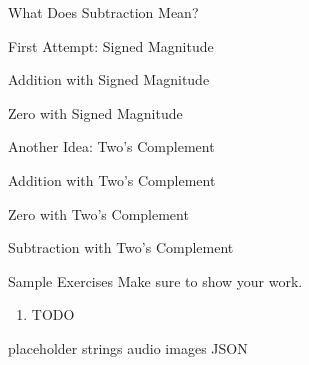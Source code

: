 
\begin{frame}{What Does Subtraction Mean?}
\end{frame}

\begin{frame}{First Attempt: Signed Magnitude}
\end{frame}

\begin{frame}{Addition with Signed Magnitude}
\end{frame}

\begin{frame}{Zero with Signed Magnitude}
\end{frame}

\begin{frame}{Another Idea: Two's Complement}
\end{frame}

\begin{frame}{Addition with Two's Complement}
\end{frame}

\begin{frame}{Zero with Two's Complement}
\end{frame}

\begin{frame}{Subtraction with Two's Complement}
\end{frame}

\begin{frame}{Sample Exercises}
Make sure to show your work.
\vfill 
\begin{enumerate}
    \item TODO
    \vfill 
\end{enumerate}
\end{frame}




\begin{frame}{placeholder}
    strings
    audio
    images
    JSON
\end{frame}
    
